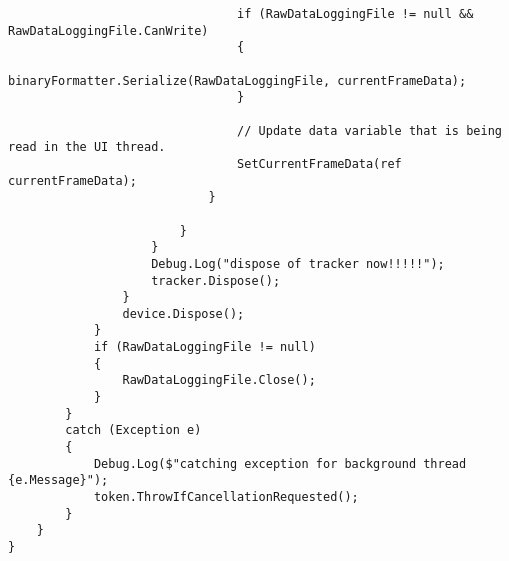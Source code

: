 \begin{verbatim}
                                if (RawDataLoggingFile != null && RawDataLoggingFile.CanWrite)
                                {
                                    binaryFormatter.Serialize(RawDataLoggingFile, currentFrameData);
                                }

                                // Update data variable that is being read in the UI thread.
                                SetCurrentFrameData(ref currentFrameData);
                            }

                        }
                    }
                    Debug.Log("dispose of tracker now!!!!!");
                    tracker.Dispose();
                }
                device.Dispose();
            }
            if (RawDataLoggingFile != null)
            {
                RawDataLoggingFile.Close();
            }
        }
        catch (Exception e)
        {
            Debug.Log($"catching exception for background thread {e.Message}");
            token.ThrowIfCancellationRequested();
        }
    }
}
\end{verbatim}
